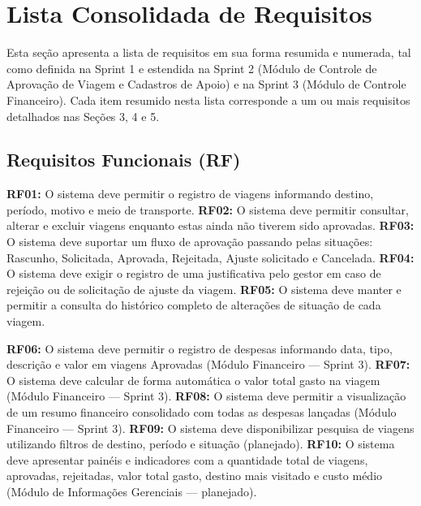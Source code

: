 \documentclass[12pt,article,oneside,a4paper]{abntex2}
\begin{document}
\bigskip

\section{Lista Consolidada de Requisitos}

Esta seção apresenta a lista de requisitos em sua forma resumida e numerada,
tal como definida na Sprint 1 e estendida na Sprint 2 (Módulo de Controle de
Aprovação de Viagem e Cadastros de Apoio) e na Sprint 3 (Módulo de Controle
Financeiro). Cada item resumido nesta lista corresponde a um ou mais
requisitos detalhados nas Seções 3, 4 e 5.

\subsection{Requisitos Funcionais (RF)}

\textbf{RF01:} O sistema deve permitir o registro de viagens informando
destino, período, motivo e meio de transporte.
\textbf{RF02:} O sistema deve permitir consultar, alterar e excluir viagens
enquanto estas ainda não tiverem sido aprovadas.
\textbf{RF03:} O sistema deve suportar um fluxo de aprovação passando pelas
situações: Rascunho, Solicitada, Aprovada, Rejeitada, Ajuste solicitado e
Cancelada.
\textbf{RF04:} O sistema deve exigir o registro de uma justificativa pelo
gestor em caso de rejeição ou de solicitação de ajuste da viagem.
\textbf{RF05:} O sistema deve manter e permitir a consulta do histórico
completo de alterações de situação de cada viagem.

\textbf{RF06:} O sistema deve permitir o registro de despesas informando
data, tipo, descrição e valor em viagens Aprovadas (Módulo Financeiro ---
Sprint 3).
\textbf{RF07:} O sistema deve calcular de forma automática o valor total
gasto na viagem (Módulo Financeiro --- Sprint 3).
\textbf{RF08:} O sistema deve permitir a visualização de um resumo financeiro
consolidado com todas as despesas lançadas (Módulo Financeiro --- Sprint 3).
\textbf{RF09:} O sistema deve disponibilizar pesquisa de viagens utilizando
filtros de destino, período e situação (planejado).
\textbf{RF10:} O sistema deve apresentar painéis e indicadores com a
quantidade total de viagens, aprovadas, rejeitadas, valor total gasto,
destino mais visitado e custo médio (Módulo de Informações Gerenciais ---
planejado).
\end{document}
